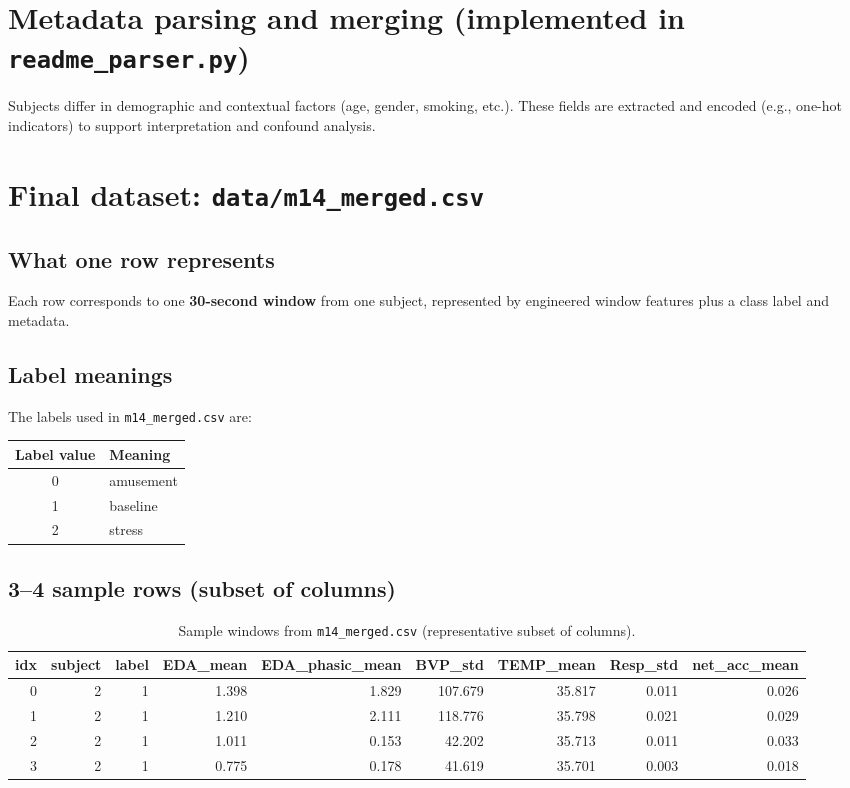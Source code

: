 \documentclass[11pt]{article}
\begin{document}
\section{Metadata parsing and merging (implemented in \texttt{readme\_parser.py})}
Subjects differ in demographic and contextual factors (age, gender, smoking, etc.). These fields are extracted and encoded (e.g., one-hot indicators)
to support interpretation and confound analysis.

\section{Final dataset: \texttt{data/m14\_merged.csv}}
\subsection{What one row represents}
Each row corresponds to one \textbf{30-second window} from one subject, represented by engineered window features plus a class label and metadata.

\subsection{Label meanings}
The labels used in \texttt{m14\_merged.csv} are:
\begin{center}
\begin{tabular}{cl}
\toprule
\textbf{Label value} & \textbf{Meaning} \\
\midrule
0 & amusement \\
1 & baseline \\
2 & stress \\
\bottomrule
\end{tabular}
\end{center}

\subsection{3--4 sample rows (subset of columns)}
\begin{table}[H]
  \centering
  \small
  \begin{tabular}{@{}rrrrrrrrr@{}}
    \toprule
    idx & subject & label & EDA\_mean & EDA\_phasic\_mean & BVP\_std & TEMP\_mean & Resp\_std & net\_acc\_mean \\
    \midrule
    0 & 2 & 1 & 1.398 & 1.829 & 107.679 & 35.817 & 0.011 & 0.026 \\
    1 & 2 & 1 & 1.210 & 2.111 & 118.776 & 35.798 & 0.021 & 0.029 \\
    2 & 2 & 1 & 1.011 & 0.153 & 42.202 & 35.713 & 0.011 & 0.033 \\
    3 & 2 & 1 & 0.775 & 0.178 & 41.619 & 35.701 & 0.003 & 0.018 \\
    \bottomrule
  \end{tabular}
  \caption{Sample windows from \texttt{m14\_merged.csv} (representative subset of columns).}
  \label{tab:samples}
\end{table}
\end{document}
